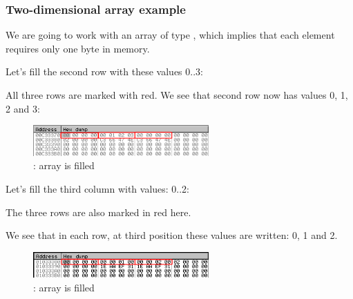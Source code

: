 \subsubsection{Two-dimensional array example}

We are going to work with an array of type \Tchar, which implies that each element requires only one 
byte in memory.

\myindex{\olly}

Let's fill the second row with these values 0..3:



All three rows are marked with red. 
We see that second row now has values 0, 1, 2 and 3:

\begin{figure}[H]
\centering
\ifdefined\ebook
{}
\else
\includegraphics[width=0.6\textwidth]{patterns/13_arrays/5_multidimensional/olly_2D_1.png}
\fi
\caption{\olly: array is filled}
\end{figure}

\myindex{\olly}

Let's fill the third column with values: 0..2:



The three rows are also marked in red here. 

We see that in each row, at third position these values are written: 0, 1 and 2.

\begin{figure}[H]
\centering
\ifdefined\ebook
{}
\else
\includegraphics[width=0.6\textwidth]{patterns/13_arrays/5_multidimensional/olly_2D_2.png}
\fi
\caption{\olly: array is filled}
\end{figure}

